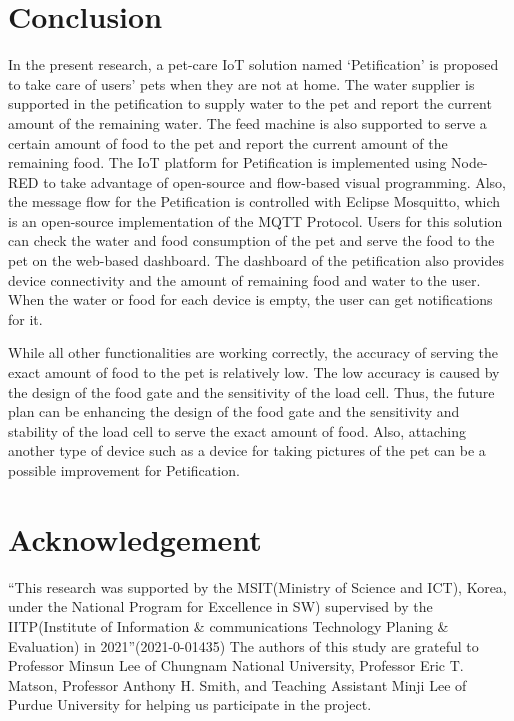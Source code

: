 \documentclass[conference]{IEEEtran}
\begin{document}
\section{Conclusion}
In the present research, a pet-care IoT solution named ‘Petification’ is proposed to take care of users’ pets when they are not at home. The water supplier is supported in the petification to supply water to the pet and report the current amount of the remaining water. The feed machine is also supported to serve a certain amount of food to the pet and report the current amount of the remaining food. The IoT platform for Petification is implemented using Node-RED to take advantage of open-source and flow-based visual programming. Also, the message flow for the Petification is controlled with Eclipse Mosquitto, which is an open-source implementation of the MQTT Protocol. Users for this solution can check the water and food consumption of the pet and serve the food to the pet on the web-based dashboard. The dashboard of the petification also provides device connectivity and the amount of remaining food and water to the user. When the water or food for each device is empty, the user can get notifications for it.

While all other functionalities are working correctly, the accuracy of serving the exact amount of food to the pet is relatively low. The low accuracy is caused by the design of the food gate and the sensitivity of the load cell. Thus, the future plan can be enhancing the design of the food gate and the sensitivity and stability of the load cell to serve the exact amount of food. Also, attaching another type of device such as a device for taking pictures of the pet can be a possible improvement for Petification.

\section{Acknowledgement}
“This research was supported by the MSIT(Ministry of Science and ICT), Korea, under the National Program for Excellence in SW) supervised by the IITP(Institute of Information \& communications Technology Planing \& Evaluation) in 2021”(2021-0-01435)
The authors of this study are grateful to Professor Minsun Lee of Chungnam National University, Professor Eric T. Matson, Professor Anthony H. Smith, and Teaching Assistant Minji Lee of Purdue University for helping us participate in the project.
\end{document}
